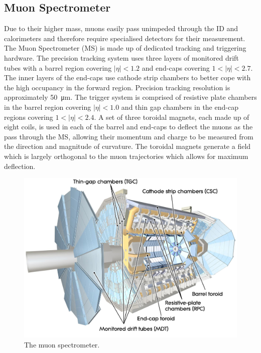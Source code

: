 \subsection{Muon Spectrometer}\label{sec:muon_spectrometer}
Due to their higher mass, muons easily pass unimpeded through the ID and calorimeters and therefore require specialised detectors for their measurement.
The Muon Spectrometer (MS) is made up of dedicated tracking and triggering hardware.
The precision tracking system uses three layers of monitored drift tubes with a barrel region covering $|\eta| < 1.2$ and end-caps covering $1 < |\eta| < 2.7$. The inner layers of the end-caps use cathode strip chambers to better cope with the high occupancy in the forward region.
Precision tracking resolution is approximately \SI{50}{\micro\meter}.
The trigger system is comprised of resistive plate chambers in the barrel region covering $|\eta| < 1.0$ and thin gap chambers in the end-cap regions covering $1 < |\eta| < 2.4$.
A set of three toroidal magnets, each made up of eight coils, is used in each of the barrel and end-caps to deflect the muons as the pass through the MS, allowing their momentum and charge to be measured from the direction and magnitude of curvature.
The toroidal magnets generate a field which is largely orthogonal to the muon trajectories which allows for maximum deflection.
%
\begin{figure}[!htpb]
  \centering
  \includegraphics[width=0.7\linewidth]{chapters/2.detector/figs/atlas_muon_system.jpg}
  \caption{The \ATLAS muon spectrometer.}
  \label{fig:atlas_muon_system}
\end{figure}
%


